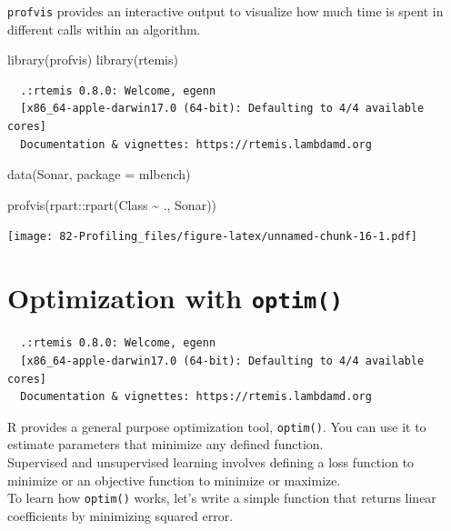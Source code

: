\documentclass[
]{book}
\newenvironment{Shaded}{\begin{snugshade}}{\end{snugshade}}
\newcommand{\AttributeTok}[1]{\textcolor[rgb]{0.77,0.63,0.00}{#1}}
\newcommand{\FunctionTok}[1]{\textcolor[rgb]{0.00,0.00,0.00}{#1}}
\newcommand{\NormalTok}[1]{#1}
\newcommand{\SpecialCharTok}[1]{\textcolor[rgb]{0.00,0.00,0.00}{#1}}
\newcommand{\StringTok}[1]{\textcolor[rgb]{0.31,0.60,0.02}{#1}}
\begin{document}
\texttt{profvis} provides an interactive output to visualize how much time is spent in different calls within an algorithm.

\begin{Shaded}
\begin{Highlighting}[]
\FunctionTok{library}\NormalTok{(profvis)}
\FunctionTok{library}\NormalTok{(rtemis)}
\end{Highlighting}
\end{Shaded}

\begin{verbatim}
  .:rtemis 0.8.0: Welcome, egenn
  [x86_64-apple-darwin17.0 (64-bit): Defaulting to 4/4 available cores]
  Documentation & vignettes: https://rtemis.lambdamd.org
\end{verbatim}

\begin{Shaded}
\begin{Highlighting}[]
\FunctionTok{data}\NormalTok{(Sonar, }\AttributeTok{package =} \StringTok{\textquotesingle{}mlbench\textquotesingle{}}\NormalTok{)}
\end{Highlighting}
\end{Shaded}

\begin{Shaded}
\begin{Highlighting}[]
\FunctionTok{profvis}\NormalTok{(rpart}\SpecialCharTok{::}\FunctionTok{rpart}\NormalTok{(Class }\SpecialCharTok{\textasciitilde{}}\NormalTok{ ., Sonar))}
\end{Highlighting}
\end{Shaded}

\texttt{[image: 82-Profiling\_files/figure-latex/unnamed-chunk-16-1.pdf]}

\hypertarget{optim}{%
\chapter{\texorpdfstring{Optimization with \texttt{optim()}}{Optimization with optim()}}\label{optim}}

\begin{verbatim}
  .:rtemis 0.8.0: Welcome, egenn
  [x86_64-apple-darwin17.0 (64-bit): Defaulting to 4/4 available cores]
  Documentation & vignettes: https://rtemis.lambdamd.org
\end{verbatim}

R provides a general purpose optimization tool, \texttt{optim()}. You can use it to estimate parameters that minimize any defined function.\\
Supervised and unsupervised learning involves defining a loss function to minimize or an objective function to minimize or maximize.\\
To learn how \texttt{optim()} works, let's write a simple function that returns linear coefficients by minimizing squared error.
\end{document}
